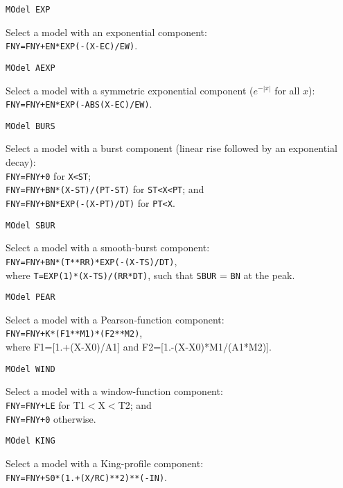 \medskip\begin{verbatim}
MOdel EXP
\end{verbatim}
Select a model with an exponential component:\\
{\tt FNY=FNY+EN*EXP(-(X-EC)/EW)}.

\medskip\begin{verbatim}
MOdel AEXP
\end{verbatim}
Select a model with a symmetric exponential component
($e^{-|x|}$ for all $x$):\\
{\tt FNY=FNY+EN*EXP(-ABS(X-EC)/EW)}.

\medskip\begin{verbatim}
MOdel BURS
\end{verbatim}
Select a model with a burst component (linear rise followed by an
exponential decay):\\
{\tt FNY=FNY+0} for {\tt X<ST};\\
{\tt FNY=FNY+BN*(X-ST)/(PT-ST)} for {\tt ST<X<PT}; and\\
{\tt FNY=FNY+BN*EXP(-(X-PT)/DT)} for {\tt PT<X}.

\medskip\begin{verbatim}
MOdel SBUR
\end{verbatim}
Select a model with a smooth-burst component:\\
{\tt FNY=FNY+BN*(T**RR)*EXP(-(X-TS)/DT)},\\
where {\tt T=EXP(1)*(X-TS)/(RR*DT)},
such that {\tt SBUR} = {\tt BN} at the peak.

\medskip\begin{verbatim}
MOdel PEAR
\end{verbatim}
Select a model with a Pearson-function component:\\
{\tt FNY=FNY+K*(F1**M1)*(F2**M2)},\\
where F1=[1.+(X-X0)/A1] and F2=[1.-(X-X0)*M1/(A1*M2)].

\medskip\begin{verbatim}
MOdel WIND
\end{verbatim}
Select a model with a window-function component:\\
{\tt FNY=FNY+LE} for T1$<$X$<$T2; and\\
{\tt FNY=FNY+0} otherwise.

\medskip\begin{verbatim}
MOdel KING
\end{verbatim}
Select a model with a King-profile component:\\
{\tt FNY=FNY+S0*(1.+(X/RC)**2)**(-IN)}.

